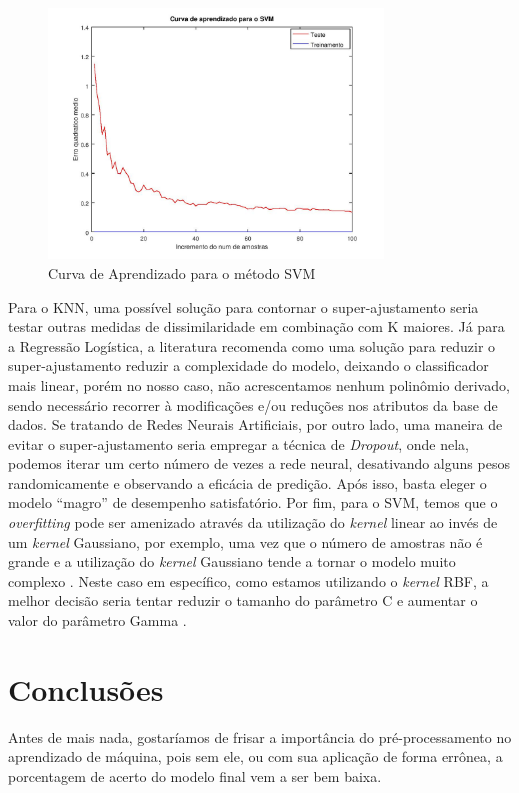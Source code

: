 \documentclass[10pt, conference, compsocconf]{IEEEtran}
\begin{document}
\begin{figure}[!t]
\centering
\includegraphics[width=3.5in]{imgs/SVMcurve.jpg}
\caption{Curva de Aprendizado para o método SVM}
\label{fig:svm_curve}
\end{figure}

Para o KNN, uma possível solução para contornar o super-ajustamento seria testar
outras medidas de dissimilaridade em combinação com K maiores. Já para a
Regressão Logística, a literatura recomenda como uma solução para reduzir o
super-ajustamento reduzir a complexidade do modelo, deixando o classificador
mais linear, porém no nosso caso, não acrescentamos nenhum polinômio derivado,
sendo necessário recorrer à modificações e/ou reduções nos atributos da base de
dados. Se tratando de Redes Neurais Artificiais, por outro lado, uma maneira de
evitar o super-ajustamento seria empregar a técnica de \textit{Dropout}, onde
nela, podemos iterar um certo número de vezes a rede neural, desativando alguns
pesos randomicamente e observando a eficácia de predição. Após isso, basta
eleger o modelo ``magro''  de desempenho satisfatório. 
Por fim, para o SVM, temos que o \textit{overfitting} pode ser amenizado através 
da utilização do \textit{kernel} linear ao invés de um \textit{kernel} Gaussiano, 
por exemplo, uma vez que o número de amostras não é grande e a utilização do 
\textit{kernel} Gaussiano tende a tornar o modelo muito complexo \cite{svm_user_guide}. 
Neste caso em específico, como estamos utilizando o \textit{kernel} RBF, a melhor 
decisão seria tentar reduzir o tamanho do parâmetro C e aumentar o valor do 
parâmetro Gamma \cite{svm_quora}.

\section{Conclusões}\label{sec:conclusao}
Antes de mais nada, gostaríamos de frisar a importância do pré-processamento no aprendizado de máquina, pois sem ele, ou com sua aplicação de forma errônea, a porcentagem de acerto do modelo final vem a ser bem baixa.
\end{document}
